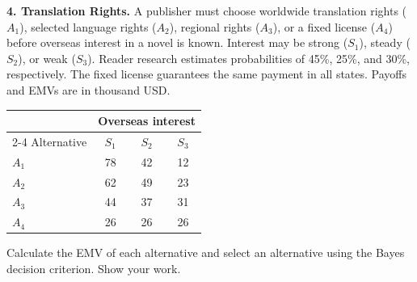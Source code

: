 \noindent\begin{minipage}[t][0.48\textheight][t]{\textwidth}
\textbf{4. Translation Rights.} A publisher must choose worldwide translation rights ($A_1$), selected
language rights ($A_2$), regional rights ($A_3$), or a fixed license ($A_4$)
before overseas interest in a novel is known. Interest may be strong ($S_1$),
steady ($S_2$), or weak ($S_3$). Reader research estimates probabilities
of 45\%, 25\%, and 30\%, respectively. The fixed license guarantees the
same payment in all states. Payoffs and EMVs are in thousand USD.

\begin{center}
		\renewcommand{\arraystretch}{1.3}
		\small
		\begin{tabular}{lccc}
			\toprule
			& \multicolumn{3}{c}{Overseas interest} \\
			\cmidrule(lr){2-4}
			Alternative & $S_1$ & $S_2$ & $S_3$ \\
			\midrule
			$A_1$ & 78 & 42 & 12 \\
			$A_2$ & 62 & 49 & 23 \\
			$A_3$ & 44 & 37 & 31 \\
			$A_4$ & 26 & 26 & 26 \\
			\bottomrule
		\end{tabular}
	\end{center}

Calculate the EMV of each alternative and select an alternative using the Bayes decision criterion. Show your work.
\par\vfill
\end{minipage}\par

\newpage

